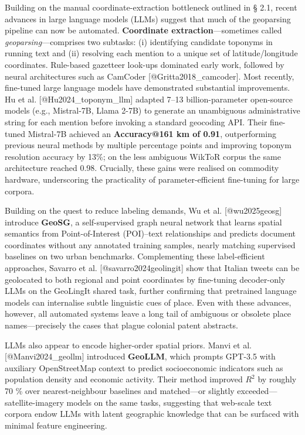 \documentclass[
  11pt,
]{article}
\begin{document}
Building on the manual coordinate-extraction bottleneck outlined in §
2.1, recent advances in large language models (LLMs) suggest that much
of the geoparsing pipeline can now be automated. \textbf{Coordinate
extraction}---sometimes called \emph{geoparsing}---comprises two
subtasks: (i) identifying candidate toponyms in running text and (ii)
resolving each mention to a unique set of latitude/longitude
coordinates. Rule-based gazetteer look-ups dominated early work,
followed by neural architectures such as CamCoder
{[}@Gritta2018\_camcoder{]}. Most recently, fine-tuned large language
models have demonstrated substantial improvements. Hu et al.
{[}@Hu2024\_toponym\_llm{]} adapted 7--13 billion-parameter open-source
models (e.g., Mistral-7B, Llama 2-7B) to generate an unambiguous
administrative string for each mention before invoking a standard
geocoding API. Their fine-tuned Mistral-7B achieved an
\textbf{Accuracy@161 km of 0.91}, outperforming previous neural methods
by multiple percentage points and improving toponym resolution accuracy
by 13\%; on the less ambiguous WikToR corpus the same architecture
reached 0.98. Crucially, these gains were realised on commodity
hardware, underscoring the practicality of parameter-efficient
fine-tuning for large corpora.

Building on the quest to reduce labeling demands, Wu et al.
{[}@wu2025geosg{]} introduce \textbf{GeoSG}, a self-supervised graph
neural network that learns spatial semantics from Point-of-Interest
(POI)--text relationships and predicts document coordinates without any
annotated training samples, nearly matching supervised baselines on two
urban benchmarks. Complementing these label-efficient approaches,
Savarro et al. {[}@savarro2024geolingit{]} show that Italian tweets can
be geolocated to both regional and point coordinates by fine-tuning
decoder-only LLMs on the GeoLingIt shared task, further confirming that
pretrained language models can internalise subtle linguistic cues of
place. Even with these advances, however, all automated systems leave a
long tail of ambiguous or obsolete place names---precisely the cases
that plague colonial patent abstracts.

LLMs also appear to encode higher-order spatial priors. Manvi et al.
{[}@Manvi2024\_geollm{]} introduced \textbf{GeoLLM}, which prompts
GPT-3.5 with auxiliary OpenStreetMap context to predict socioeconomic
indicators such as population density and economic activity. Their
method improved \(R^{2}\) by roughly 70 \% over nearest-neighbour
baselines and matched---or slightly exceeded---satellite-imagery models
on the same tasks, suggesting that web-scale text corpora endow LLMs
with latent geographic knowledge that can be surfaced with minimal
feature engineering.
\end{document}
